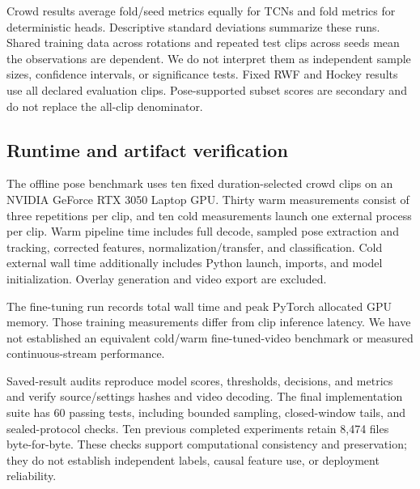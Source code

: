 Crowd results average fold/seed metrics equally for TCNs and fold metrics for deterministic heads. Descriptive standard deviations summarize these runs. Shared training data across rotations and repeated test clips across seeds mean the observations are dependent. We do not interpret them as independent sample sizes, confidence intervals, or significance tests. Fixed RWF and Hockey results use all declared evaluation clips. Pose-supported subset scores are secondary and do not replace the all-clip denominator.

\subsection{Runtime and artifact verification}
The offline pose benchmark uses ten fixed duration-selected crowd clips on an NVIDIA GeForce RTX 3050 Laptop GPU. Thirty warm measurements consist of three repetitions per clip, and ten cold measurements launch one external process per clip. Warm pipeline time includes full decode, sampled pose extraction and tracking, corrected features, normalization/transfer, and classification. Cold external wall time additionally includes Python launch, imports, and model initialization. Overlay generation and video export are excluded.

The fine-tuning run records total wall time and peak PyTorch allocated GPU memory. Those training measurements differ from clip inference latency. We have not established an equivalent cold/warm fine-tuned-video benchmark or measured continuous-stream performance.

Saved-result audits reproduce model scores, thresholds, decisions, and metrics and verify source/settings hashes and video decoding. The final implementation suite has 60 passing tests, including bounded sampling, closed-window tails, and sealed-protocol checks. Ten previous completed experiments retain 8,474 files byte-for-byte. These checks support computational consistency and preservation; they do not establish independent labels, causal feature use, or deployment reliability.
